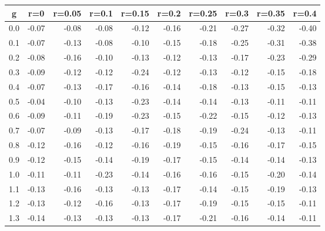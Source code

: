 %
\begin{table}[!tbp]
 \begin{center}
 \begin{tabular}{rrrrrrrrrr}\hline\hline
\multicolumn{1}{c}{g}&\multicolumn{1}{c}{r=0}&\multicolumn{1}{c}{r=0.05}&\multicolumn{1}{c}{r=0.1}&\multicolumn{1}{c}{r=0.15}&\multicolumn{1}{c}{r=0.2}&\multicolumn{1}{c}{r=0.25}&\multicolumn{1}{c}{r=0.3}&\multicolumn{1}{c}{r=0.35}&\multicolumn{1}{c}{r=0.4}\tabularnewline
\hline
0.0&-0.07&-0.08&-0.08&-0.12&-0.16&-0.21&-0.27&-0.32&-0.40\tabularnewline
0.1&-0.07&-0.13&-0.08&-0.10&-0.15&-0.18&-0.25&-0.31&-0.38\tabularnewline
0.2&-0.08&-0.16&-0.10&-0.13&-0.12&-0.13&-0.17&-0.23&-0.29\tabularnewline
0.3&-0.09&-0.12&-0.12&-0.24&-0.12&-0.13&-0.12&-0.15&-0.18\tabularnewline
0.4&-0.07&-0.13&-0.17&-0.16&-0.14&-0.18&-0.13&-0.15&-0.13\tabularnewline
0.5&-0.04&-0.10&-0.13&-0.23&-0.14&-0.14&-0.13&-0.11&-0.11\tabularnewline
0.6&-0.09&-0.11&-0.19&-0.23&-0.15&-0.22&-0.15&-0.12&-0.13\tabularnewline
0.7&-0.07&-0.09&-0.13&-0.17&-0.18&-0.19&-0.24&-0.13&-0.11\tabularnewline
0.8&-0.12&-0.16&-0.12&-0.16&-0.19&-0.15&-0.16&-0.17&-0.15\tabularnewline
0.9&-0.12&-0.15&-0.14&-0.19&-0.17&-0.15&-0.14&-0.14&-0.13\tabularnewline
1.0&-0.11&-0.11&-0.23&-0.14&-0.16&-0.16&-0.15&-0.20&-0.14\tabularnewline
1.1&-0.13&-0.16&-0.13&-0.13&-0.17&-0.14&-0.15&-0.19&-0.13\tabularnewline
1.2&-0.13&-0.12&-0.16&-0.13&-0.17&-0.19&-0.15&-0.15&-0.11\tabularnewline
1.3&-0.14&-0.13&-0.13&-0.13&-0.17&-0.21&-0.16&-0.14&-0.11\tabularnewline
\hline
\end{tabular}

\end{center}

\end{table}


